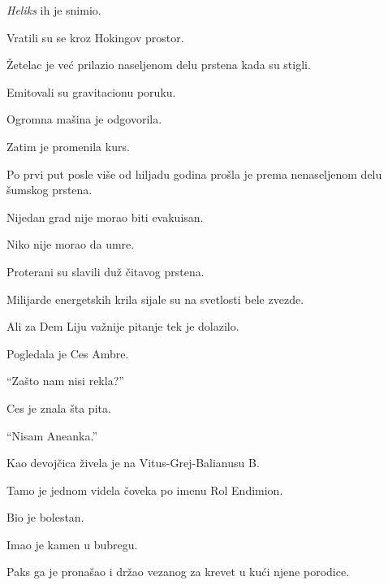 \emph{Heliks} ih je snimio.

\bigskip

Vratili su se kroz Hokingov prostor.

\bigskip

Žetelac je već prilazio naseljenom delu prstena kada su stigli.

\bigskip

Emitovali su gravitacionu poruku.

\bigskip

Ogromna mašina je odgovorila.

\bigskip

Zatim je promenila kurs.

\bigskip

Po prvi put posle više od hiljadu godina prošla je prema nenaseljenom delu šumskog prstena.

\bigskip

Nijedan grad nije morao biti evakuisan.

\bigskip

Niko nije morao da umre.

\bigskip

Proterani su slavili duž čitavog prstena.

\bigskip

Milijarde energetskih krila sijale su na svetlosti bele zvezde.

\bigskip

Ali za Dem Liju važnije pitanje tek je dolazilo.

\bigskip

Pogledala je Ces Ambre.

``Zašto nam nisi rekla?''

\bigskip

Ces je znala šta pita.

\bigskip

``Nisam Aneanka.''

\bigskip

Kao devojčica živela je na Vitus-Grej-Balianusu B.

\bigskip

Tamo je jednom videla čoveka po imenu Rol Endimion.

\bigskip

Bio je bolestan.

Imao je kamen u bubregu.

\bigskip

Paks ga je pronašao i držao vezanog za krevet u kući njene porodice.

\bigskip

